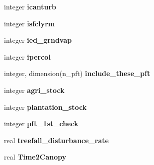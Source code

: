 \begin{DoxyCompactItemize}
\item 
\hypertarget{structename__coms_1_1ename__vars_ab4714df83ca3c2287d90a37ecad70224}{
integer {\bfseries icanturb}}
\label{structename__coms_1_1ename__vars_ab4714df83ca3c2287d90a37ecad70224}

\item 
\hypertarget{structename__coms_1_1ename__vars_a1377d0f7585ac7ad79a339e984ceae8f}{
integer {\bfseries isfclyrm}}
\label{structename__coms_1_1ename__vars_a1377d0f7585ac7ad79a339e984ceae8f}

\item 
\hypertarget{structename__coms_1_1ename__vars_a8581155b5265ff836367e5df3df4275c}{
integer {\bfseries ied\_\-grndvap}}
\label{structename__coms_1_1ename__vars_a8581155b5265ff836367e5df3df4275c}

\item 
\hypertarget{structename__coms_1_1ename__vars_a58d5105fef5f1529ef1d031b20995147}{
integer {\bfseries ipercol}}
\label{structename__coms_1_1ename__vars_a58d5105fef5f1529ef1d031b20995147}

\item 
\hypertarget{structename__coms_1_1ename__vars_a63f1da400b83b97c8b830f3c629271d5}{
integer, dimension(n\_\-pft) {\bfseries include\_\-these\_\-pft}}
\label{structename__coms_1_1ename__vars_a63f1da400b83b97c8b830f3c629271d5}

\item 
\hypertarget{structename__coms_1_1ename__vars_a7a77bc951dacf24a3ac1538b524e9c1d}{
integer {\bfseries agri\_\-stock}}
\label{structename__coms_1_1ename__vars_a7a77bc951dacf24a3ac1538b524e9c1d}

\item 
\hypertarget{structename__coms_1_1ename__vars_a3722272c39c92fba801c8c80d4edf1ad}{
integer {\bfseries plantation\_\-stock}}
\label{structename__coms_1_1ename__vars_a3722272c39c92fba801c8c80d4edf1ad}

\item 
\hypertarget{structename__coms_1_1ename__vars_abfe25a7b4b698d0f161a9d63003a531d}{
integer {\bfseries pft\_\-1st\_\-check}}
\label{structename__coms_1_1ename__vars_abfe25a7b4b698d0f161a9d63003a531d}

\item 
\hypertarget{structename__coms_1_1ename__vars_a61bcf5b6ae099342995ce09bc5238daa}{
real {\bfseries treefall\_\-disturbance\_\-rate}}
\label{structename__coms_1_1ename__vars_a61bcf5b6ae099342995ce09bc5238daa}

\item 
\hypertarget{structename__coms_1_1ename__vars_abbefec393e8f948631196d9516078618}{
real {\bfseries Time2Canopy}}
\label{structename__coms_1_1ename__vars_abbefec393e8f948631196d9516078618}


\end{DoxyCompactItemize}
